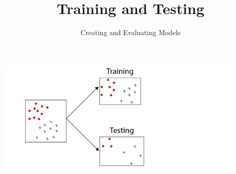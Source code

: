\documentclass[aspectratio=169, 14pt,usenames,dvipsnames]{beamer}
\begin{document}
{ 
\1
\begin{frame}
	\title{Training and Testing}
	\subtitle{Creating and Evaluating Models}
	\maketitle
\end{frame}
}

\begin{frame}
	\includegraphics[width=0.9\textwidth, height=0.65\textheight]{Images/deeper_look_9.png}
\end{frame}
\end{document}
